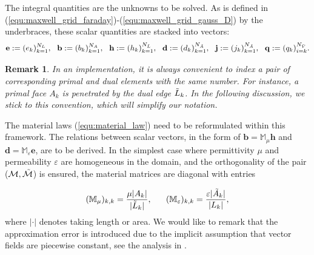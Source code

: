 \documentclass{article}
\newtheorem*{remark}{Remark}
\begin{document}
The integral quantities are the unknowns to be solved. As is defined in (\ref{equ:maxwell_grid_faraday})-(\ref{equ:maxwell_grid_gauss_D}) by the underbraces, these scalar quantities are stacked into vectors:
\begin{equation} \label{equ:fit_scale_vector}
    \mathbf{e} := (e_k)_{k=1}^{N_L},\ \ \mathbf{b} := (b_k)_{k=1}^{N_A}, \ \ \mathbf{h} := (h_k)_{k=1}^{N_{\Tilde{L}}}, \ \ \mathbf{d} := (d_k)_{k=1}^{N_{\Tilde{A}}}, \ \ \mathbf{j} := (j_k)_{k=1}^{N_{\Tilde{A}}}, \ \ \mathbf{q} := (q_k)_{i=k}^{N_{\Tilde{V}}}.
\end{equation}

\begin{remark}
    In an implementation, it is always convenient to index a pair of corresponding primal and dual elements with the same number. For instance, a primal face $A_k$ is penetrated by the dual edge $\Tilde{L}_k$. In the following discussion, we stick to this convention, which will simplify our notation.
\end{remark}

The material laws (\ref{equ:material_law}) need to be reformulated within this framework. The relations between scalar vectors, in the form of $\mathbf{b} = \mathbb{M}_\mu \mathbf{h}$ and $\mathbf{d} = \mathbb{M}_\varepsilon \mathbf{e}$, are to be derived. In the simplest case where permittivity $\mu$ and permeability $\varepsilon$ are homogeneous in the domain, and the orthogonality of the pair ($\mathcal{M}, \Tilde{\mathcal{M}}$) is ensured, the material matrices are diagonal with entries 

\begin{equation*}
    (\mathbb{M}_\mu)_{k,k} = \frac{\mu|A_k|}{|\Tilde{L}_k|}, \ \ \ \ \ (\mathbb{M}_\varepsilon)_{k,k} = \frac{\varepsilon |\Tilde{A}_k|}{|L_k|},
\end{equation*}
where $|\cdot|$ denotes taking length or area. We would like to remark that the approximation error is introduced due to the implicit assumption that vector fields are piecewise constant, see the analysis in \cite{Marrone_2001}.
\end{document}
